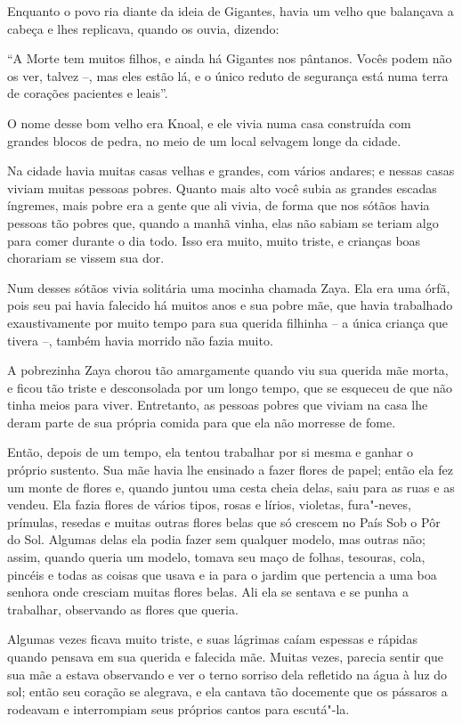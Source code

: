 Enquanto o povo ria diante da ideia de Gigantes, havia um velho que
balançava a cabeça e lhes replicava, quando os ouvia, dizendo:

``A Morte tem muitos filhos, e ainda há Gigantes nos pântanos. Vocês
podem não os ver, talvez --, mas eles estão lá, e o único reduto de
segurança está numa terra de corações pacientes e leais''.

O nome desse bom velho era Knoal, e ele vivia numa casa construída com
grandes blocos de pedra, no meio de um local selvagem longe da cidade.

Na cidade havia muitas casas velhas e grandes, com vários andares; e
nessas casas viviam muitas pessoas pobres. Quanto mais alto você subia
as grandes escadas íngremes, mais pobre era a gente que ali vivia, de
forma que nos sótãos havia pessoas tão pobres que, quando a manhã vinha,
elas não sabiam se teriam algo para comer durante o dia todo. Isso era
muito, muito triste, e crianças boas chorariam se vissem sua dor.

Num desses sótãos vivia solitária uma mocinha chamada Zaya. Ela era uma
órfã, pois seu pai havia falecido há muitos anos e sua pobre mãe, que
havia trabalhado exaustivamente por muito tempo para sua querida
filhinha -- a única criança que tivera --, também havia morrido não
fazia muito.

A pobrezinha Zaya chorou tão amargamente quando viu sua querida mãe
morta, e ficou tão triste e desconsolada por um longo tempo, que se
esqueceu de que não tinha meios para viver. Entretanto, as pessoas
pobres que viviam na casa lhe deram parte de sua própria comida para que
ela não morresse de fome.

Então, depois de um tempo, ela tentou trabalhar por si mesma e ganhar o
próprio sustento. Sua mãe havia lhe ensinado a fazer flores de papel;
então ela fez um monte de flores e, quando juntou uma cesta cheia delas,
saiu para as ruas e as vendeu. Ela fazia flores de vários tipos, rosas e
lírios, violetas, fura"-neves, prímulas, resedas e muitas outras flores
belas que só crescem no País Sob o Pôr do Sol. Algumas delas ela podia
fazer sem qualquer modelo, mas outras não; assim, quando queria um
modelo, tomava seu maço de folhas, tesouras, cola, pincéis e todas as
coisas que usava e ia para o jardim que pertencia a uma boa senhora onde
cresciam muitas flores belas. Ali ela se sentava e se punha a trabalhar,
observando as flores que queria.

Algumas vezes ficava muito triste, e suas lágrimas caíam espessas e
rápidas quando pensava em sua querida e falecida mãe. Muitas vezes,
parecia sentir que sua mãe a estava observando e ver o terno sorriso
dela refletido na água à luz do sol; então seu coração se alegrava, e
ela cantava tão docemente que os pássaros a rodeavam e interrompiam seus
próprios cantos para escutá"-la.

